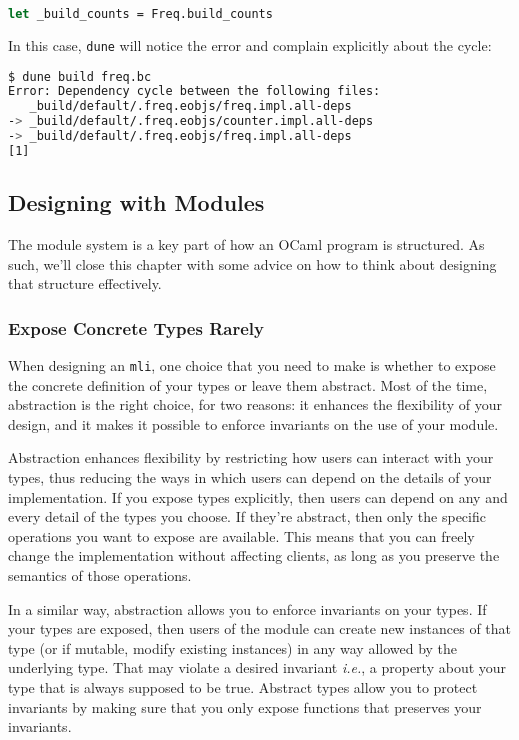 \begin{lstlisting}[language=Caml]
let _build_counts = Freq.build_counts
\end{lstlisting}

In this case, \passthrough{\lstinline!dune!} will notice the error and
complain explicitly about the cycle:

\begin{lstlisting}[language=bash]
$ dune build freq.bc
Error: Dependency cycle between the following files:
   _build/default/.freq.eobjs/freq.impl.all-deps
-> _build/default/.freq.eobjs/counter.impl.all-deps
-> _build/default/.freq.eobjs/freq.impl.all-deps
[1]
\end{lstlisting}

\hypertarget{designing-with-modules}{%
\subsection{Designing with Modules}\label{designing-with-modules}}

The module system is a key part of how an OCaml program is structured.
As such, we'll close this chapter with some advice on how to think about
designing that structure effectively.

\hypertarget{expose-concrete-types-rarely}{%
\subsubsection{Expose Concrete Types
Rarely}\label{expose-concrete-types-rarely}}

When designing an \passthrough{\lstinline!mli!}, one choice that you
need to make is whether to expose the concrete definition of your types
or leave them abstract. Most of the time, abstraction is the right
choice, for two reasons: it enhances the flexibility of your design, and
it makes it possible to enforce invariants on the use of your module.

Abstraction enhances flexibility by restricting how users can interact
with your types, thus reducing the ways in which users can depend on the
details of your implementation. If you expose types explicitly, then
users can depend on any and every detail of the types you choose. If
they're abstract, then only the specific operations you want to expose
are available. This means that you can freely change the implementation
without affecting clients, as long as you preserve the semantics of
those operations.

In a similar way, abstraction allows you to enforce invariants on your
types. If your types are exposed, then users of the module can create
new instances of that type (or if mutable, modify existing instances) in
any way allowed by the underlying type. That may violate a desired
invariant \emph{i.e.}, a property about your type that is always
supposed to be true. Abstract types allow you to protect invariants by
making sure that you only expose functions that preserves your
invariants.

